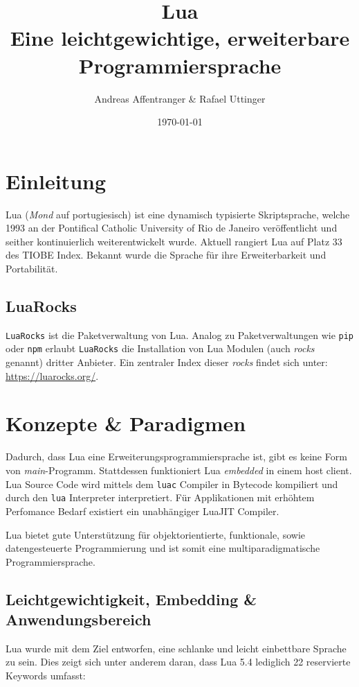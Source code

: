 \documentclass[11pt,a4paper]{article}
\title{Lua \\ [0.2em]\large Eine leichtgewichtige, erweiterbare Programmiersprache}
\author{Andreas Affentranger \& Rafael Uttinger}
\date{\today}
\begin{document}
\maketitle

\section*{Einleitung}

Lua (\textit{Mond} auf portugiesisch) ist eine dynamisch typisierte Skriptsprache, welche 1993 an der Pontifical Catholic University of Rio de Janeiro veröffentlicht und seither kontinuierlich weiterentwickelt wurde. Aktuell rangiert Lua auf Platz 33 des TIOBE Index. Bekannt wurde die Sprache für ihre Erweiterbarkeit und Portabilität.

\subsection*{LuaRocks}

\texttt{LuaRocks} ist die Paketverwaltung von Lua. 
Analog zu Paketverwaltungen wie \texttt{pip} oder \texttt{npm} erlaubt \texttt{LuaRocks} die Installation von Lua Modulen (auch \textit{rocks} genannt) dritter Anbieter. 
Ein zentraler Index dieser \textit{rocks} findet sich unter: \url{https://luarocks.org/}.

\section*{Konzepte \& Paradigmen}

Dadurch, dass Lua eine Erweiterungsprogrammiersprache ist, gibt es keine Form von \textit{main}-Programm. Stattdessen funktioniert Lua \textit{embedded} in einem host client.
Lua Source Code wird mittels dem \texttt{luac} Compiler in Bytecode kompiliert und durch den \texttt{lua} Interpreter interpretiert. Für Applikationen mit erhöhtem Perfomance Bedarf existiert ein unabhängiger LuaJIT Compiler.

Lua bietet gute Unterstützung für objektorientierte, funktionale, sowie datengesteuerte Programmierung und ist somit eine multiparadigmatische Programmiersprache.

\subsection*{Leichtgewichtigkeit, Embedding \& Anwendungsbereich}

Lua wurde mit dem Ziel entworfen, eine schlanke und leicht einbettbare Sprache zu sein. Dies zeigt sich unter anderem daran, dass Lua 5.4 lediglich 22 reservierte Keywords umfasst:
\end{document}
